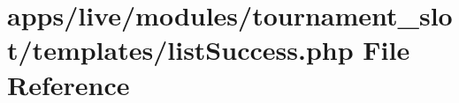\hypertarget{live_2modules_2tournament__slot_2templates_2list_success_8php}{\section{apps/live/modules/tournament\-\_\-slot/templates/list\-Success.php File Reference}
\label{live_2modules_2tournament__slot_2templates_2list_success_8php}
}
